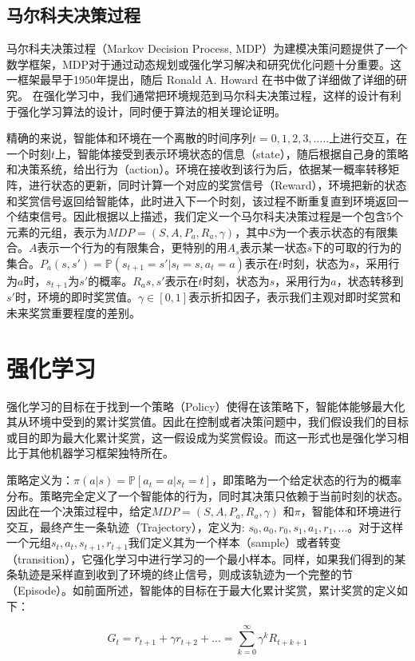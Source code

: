 \documentclass{standalone}
\begin{document}
\subsection{马尔科夫决策过程}
马尔科夫决策过程（Markov Decision Process, MDP）为建模决策问题提供了一个数学框架，MDP对于通过动态规划或强化学习解决和研究优化问题十分重要。这一框架最早于1950年提出，随后 Ronald A. Howard 在书中做了详细做了详细的研究。
在强化学习中，我们通常把环境规范到马尔科夫决策过程，这样的设计有利于强化学习算法的设计，同时便于算法的相关理论证明。\par
精确的来说，智能体和环境在一个离散的时间序列$t=0,1,2,3,... ..$上进行交互，在一个时刻$t$上，智能体接受到表示环境状态的信息（state），随后根据自己身的策略和决策系统，给出行为（action）。环境在接收到该行为后，依据某一概率转移矩阵，进行状态的更新，同时计算一个对应的奖赏信号（Reward），环境把新的状态和奖赏信号返回给智能体，此时进入下一个时刻，该过程不断重复直到环境返回一个结束信号。因此根据以上描述，我们定义一个马尔科夫决策过程是一个包含5个元素的元组，表示为$MDP=(S, A, P_{a}, R_{a}, \gamma)$，其中$S$为一个表示状态的有限集合。$A$表示一个行为的有限集合，更特别的用$A_s$表示某一状态$s$下的可取的行为的集合。$P_a(s, s') = \mathbb{P}(s_{t+1} = s'|s_t = s, a_t=a)$表示在$t$时刻，状态为$s$，采用行为$a$时，$s_{t+1}$为$s'$的概率。$R_a{s, s'}$表示在$t$时刻，状态为$s$，采用行为$a$，状态转移到$s'$时，环境的即时奖赏值。$\gamma \in [0, 1]$表示折扣因子，表示我们主观对即时奖赏和未来奖赏重要程度的差别。\par 

\section{强化学习}
强化学习的目标在于找到一个策略（Policy）使得在该策略下，智能体能够最大化其从环境中受到的累计奖赏值。因此在控制或者决策问题中，我们假设我们的目标或目的即为最大化累计奖赏，这一假设成为奖赏假设。而这一形式也是强化学习相比于其他机器学习框架独特所在。\par
策略定义为：$\pi(a|s) = \mathbb{P}[a_t=a | s_t=t]$，即策略为一个给定状态的行为的概率分布。策略完全定义了一个智能体的行为，同时其决策只依赖于当前时刻的状态。
因此在一个决策过程中，给定$MDP=(S, A, P_{a}, R_{a}, \gamma)$ 和$\pi$，智能体和环境进行交互，最终产生一条轨迹（Trajectory），定义为: $s_0, a_0, r_0, s_1, a_1, r_1, ...$。对于这样一个元组$s_t, a_t, s_{t+1}, r_{t+1}$我们定义其为一个样本（sample）或者转变（transition），它强化学习中进行学习的一个最小样本。同样，如果我们得到的某条轨迹是采样直到收到了环境的终止信号，则成该轨迹为一个完整的节（Episode）。如前面所述，智能体的目标在于最大化累计奖赏，累计奖赏的定义如下：
\begin{center}
    \begin{equation}
        G_t=r_{t+1} + \gamma r_{t+2}+... = \sum_{k=0}^{\infty}\gamma^{k}R_{t+k+1}
    \end{equation}
\end{center}
\end{document}

